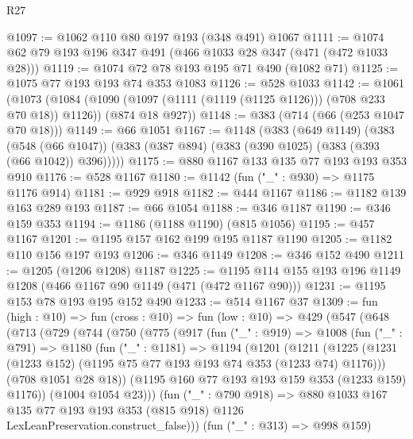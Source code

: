 \begin{lexlean}{R27}
\begin{coremodule}
@1097 := @1062 @110 @80 @197 @193 (@348 @491) @1067
@1111 := @1074 @62 @79 @193 @196 @347 @491 (@466 @1033 @28 @347 (@471 (@472 @1033 @28)))
@1119 := @1074 @72 @78 @193 @195 @71 @490 (@1082 @71)
@1125 := @1075 @77 @193 @193 @74 @353 @1083
@1126 := @528 @1033
@1142 := @1061
    (@1073
      (@1084 (@1090 (@1097 (@1111 (@1119 (@1125 @1126))) (@708 @233 @70 @18)) @1126))
      (@874 @18 @927))
@1148 := @383 (@714 (@66 (@253 @1047 @70 @18)))
@1149 := @66 @1051
@1167 := @1148
    (@383
      (@649 @1149)
      (@383
        (@548 (@66 @1047))
        (@383 (@387 @894) (@383 (@390 @1025) (@383 (@393 (@66 @1042)) @396)))))
@1175 := @880 @1167 @133 @135 @77 @193 @193 @353 @910
@1176 := @528 @1167
@1180 := @1142 (fun ("_" : @930) => @1175 @1176 @914)
@1181 := @929 @918
@1182 := @444 @1167
@1186 := @1182 @139 @163 @289 @193
@1187 := @66 @1054
@1188 := @346 @1187
@1190 := @346 @159 @353
@1194 := @1186 (@1188 @1190) (@815 @1056)
@1195 := @457 @1167
@1201 := @1195 @157 @162 @199 @195 @1187 @1190
@1205 := @1182 @110 @156 @197 @193
@1206 := @346 @1149
@1208 := @346 @152 @490
@1211 := @1205 (@1206 @1208) @1187
@1225 := @1195 @114 @155 @193 @196 @1149 @1208 (@466 @1167 @90 @1149 (@471 (@472 @1167 @90)))
@1231 := @1195 @153 @78 @193 @195 @152 @490
@1233 := @514 @1167 @37
@1309 := fun (high : @10) =>
  fun (cross : @10) =>
  fun (low : @10) =>
  @429
    (@547
      (@648
        (@713
          (@729
            (@744
              (@750
                (@775
                  (@917
                    (fun ("_" : @919) =>
                    @1008
                      (fun ("_" : @791) =>
                      @1180
                        (fun ("_" : @1181) =>
                        @1194
                          (@1201
                            (@1211
                              (@1225
                                (@1231
                                  (@1233 @152)
                                  (@1195 @75 @77 @193 @193 @74 @353 (@1233 @74) @1176)))
                              (@708 @1051 @28 @18))
                            (@1195 @160 @77 @193 @193 @159 @353 (@1233 @159) @1176))
                          (@1004 @1054 @23)))
                      (fun ("_" : @790 @918) =>
                      @880
                        @1033
                        @167
                        @135
                        @77
                        @193
                        @193
                        @353
                        (@815 @918)
                        @1126
                        LexLeanPreservation.construct_false)))
                  (fun ("_" : @313) => @998 @159)

\end{coremodule}
\end{lexlean}
